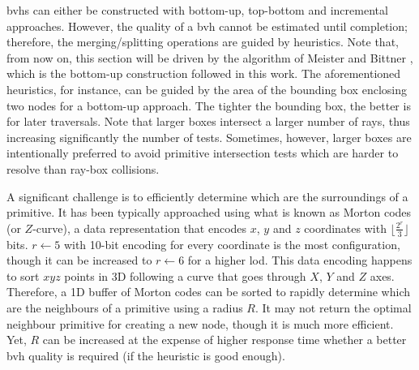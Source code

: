 \acrshort{bvh}s can either be constructed with bottom-up, top-bottom and incremental approaches. However, the quality of a \acrshort{bvh} cannot be estimated until completion; therefore, the merging/splitting operations are guided by heuristics. Note that, from now on, this section will be driven by the algorithm of Meister and Bittner \cite{meister_parallel_2018}, which is the bottom-up construction followed in this work. The aforementioned heuristics, for instance, can be guided by the area of the bounding box enclosing two nodes for a bottom-up approach. The tighter the bounding box, the better is for later traversals. Note that larger boxes intersect a larger number of rays, thus increasing significantly the number of tests. Sometimes, however, larger boxes are intentionally preferred to avoid primitive intersection tests which are harder to resolve than ray-box collisions.

A significant challenge is to efficiently determine which are the surroundings of a primitive. It has been typically approached using what is known as Morton codes (or $Z$-curve), a data representation that encodes $x$, $y$ and $z$ coordinates with $\lfloor{\frac{2^r}{3}\rfloor}$ bits. $r \gets 5$ with 10-bit encoding for every coordinate is the most configuration, though it can be increased to $r \gets 6$ for a higher \acrshort{lod}. This data encoding happens to sort $xyz$ points in 3D following a curve that goes through $X$, $Y$ and $Z$ axes. Therefore, a 1D buffer of Morton codes can be sorted to rapidly determine which are the neighbours of a primitive using a radius $R$. It may not return the optimal neighbour primitive for creating a new node, though it is much more efficient. Yet, $R$ can be increased at the expense of higher response time whether a better \acrshort{bvh} quality is required (if the heuristic is good enough). 

